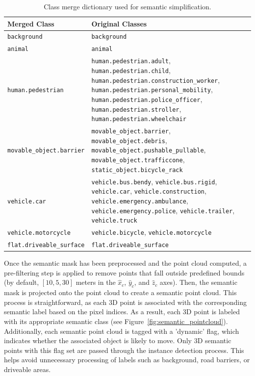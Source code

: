 \begin{table}[h!]
    \centering
    \small
    \begin{tabular}{|l|p{10cm}|}
        \hline
        \textbf{Merged Class} & \textbf{Original Classes} \\
        \hline
        \texttt{background} & \texttt{background} \\ 
        \hline
        \texttt{animal} & \texttt{animal} \\
        \hline
        \texttt{human.pedestrian} &
        \texttt{human.pedestrian.adult}, \texttt{human.pedestrian.child}, \texttt{human.pedestrian.construction\_worker}, \texttt{human.pedestrian.personal\_mobility}, \texttt{human.pedestrian.police\_officer}, \texttt{human.pedestrian.stroller}, \texttt{human.pedestrian.wheelchair} \\
        \hline
        \texttt{movable\_object.barrier} &
        \texttt{movable\_object.barrier}, \texttt{movable\_object.debris}, \texttt{movable\_object.pushable\_pullable}, \texttt{movable\_object.trafficcone}, \texttt{static\_object.bicycle\_rack} \\
        \hline
        \texttt{vehicle.car} & 
        \texttt{vehicle.bus.bendy}, \texttt{vehicle.bus.rigid}, \texttt{vehicle.car}, \texttt{vehicle.construction}, \texttt{vehicle.emergency.ambulance}, \texttt{vehicle.emergency.police}, \texttt{vehicle.trailer}, \texttt{vehicle.truck} \\
        \hline
        \texttt{vehicle.motorcycle} & 
        \texttt{vehicle.bicycle}, \texttt{vehicle.motorcycle} \\
        \hline
        \texttt{flat.driveable\_surface} & \texttt{flat.driveable\_surface} \\
        \hline
    \end{tabular}
    \caption{Class merge dictionary used for semantic simplification.}
    \label{tab:merge_dict}
\end{table}

Once the semantic mask has been preprocessed and the point cloud computed, a pre-filtering step is applied to remove points that fall outside predefined bounds (by default, $\left[10, 5, 30\right]$ meters in the $\hat{x}_c$, $\hat{y}_c$, and $\hat{z}_c$ axes). Then, the semantic mask is projected onto the point cloud to create a semantic point cloud. This process is straightforward, as each 3D point is associated with the corresponding semantic label based on the pixel indices. As a result, each 3D point is labeled with its appropriate semantic class (see Figure~\ref{fig:semantic_pointcloud}). Additionally, each semantic point cloud is tagged with a 'dynamic' flag, which indicates whether the associated object is likely to move. Only 3D semantic points with this flag set are passed through the instance detection process. This helps avoid unnecessary processing of labels such as background, road barriers, or driveable areas.

